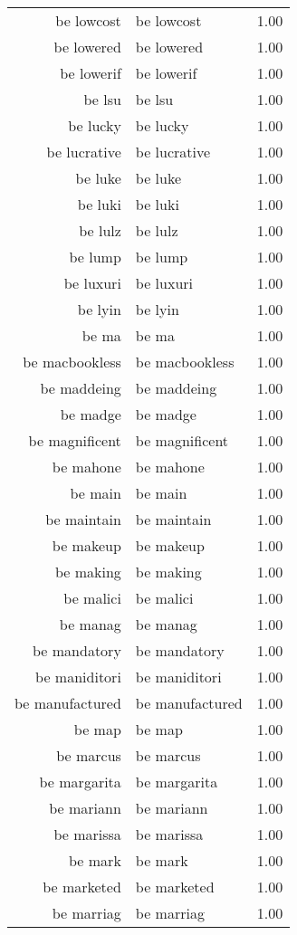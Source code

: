 \begin{table}[ht]
\begin{tabular}{rlr}
  be lowcost & be lowcost & 1.00 \\ 
  be lowered & be lowered & 1.00 \\ 
  be lowerif & be lowerif & 1.00 \\ 
  be lsu & be lsu & 1.00 \\ 
  be lucky & be lucky & 1.00 \\ 
  be lucrative & be lucrative & 1.00 \\ 
  be luke & be luke & 1.00 \\ 
  be luki & be luki & 1.00 \\ 
  be lulz & be lulz & 1.00 \\ 
  be lump & be lump & 1.00 \\ 
  be luxuri & be luxuri & 1.00 \\ 
  be lyin & be lyin & 1.00 \\ 
  be ma & be ma & 1.00 \\ 
  be macbookless & be macbookless & 1.00 \\ 
  be maddeing & be maddeing & 1.00 \\ 
  be madge & be madge & 1.00 \\ 
  be magnificent & be magnificent & 1.00 \\ 
  be mahone & be mahone & 1.00 \\ 
  be main & be main & 1.00 \\ 
  be maintain & be maintain & 1.00 \\ 
  be makeup & be makeup & 1.00 \\ 
  be making & be making & 1.00 \\ 
  be malici & be malici & 1.00 \\ 
  be manag & be manag & 1.00 \\ 
  be mandatory & be mandatory & 1.00 \\ 
  be maniditori & be maniditori & 1.00 \\ 
  be manufactured & be manufactured & 1.00 \\ 
  be map & be map & 1.00 \\ 
  be marcus & be marcus & 1.00 \\ 
  be margarita & be margarita & 1.00 \\ 
  be mariann & be mariann & 1.00 \\ 
  be marissa & be marissa & 1.00 \\ 
  be mark & be mark & 1.00 \\ 
  be marketed & be marketed & 1.00 \\ 
  be marriag & be marriag & 1.00 \\ 

\end{tabular}
\end{table}
